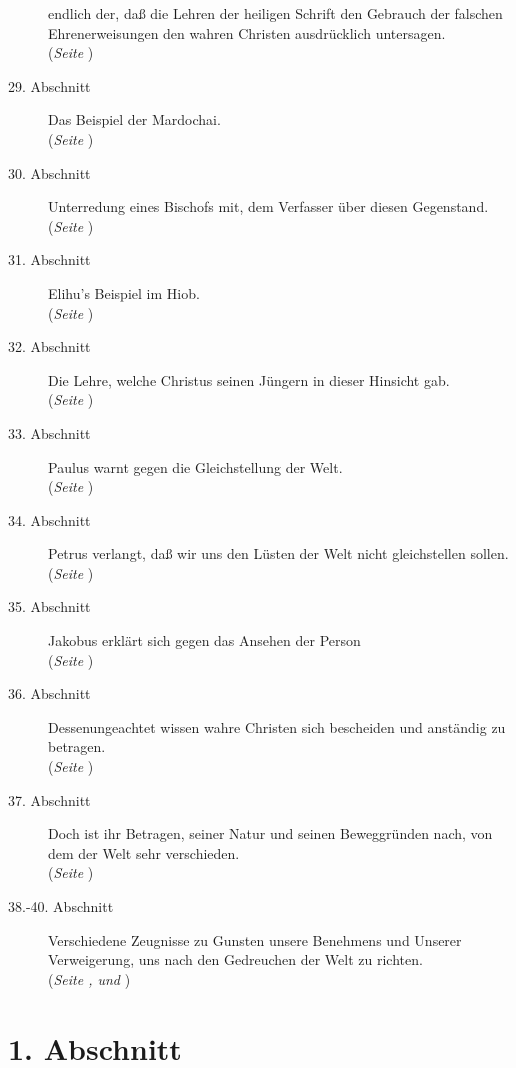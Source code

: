 \begin{description}
endlich der,
daß die Lehren der heiligen Schrift den Gebrauch der falschen Ehrenerweisungen
den wahren Christen ausdrücklich untersagen.
\\ (\textit{Seite \pageref{kap9_ab28}})
\item[29. Abschnitt] Das Beispiel der Mardochai.
\\ (\textit{Seite \pageref{kap9_ab29}})
\item[30. Abschnitt] Unterredung eines Bischofs mit, dem Verfasser über diesen
Gegenstand.
\\ (\textit{Seite \pageref{kap9_ab30}})
\item[31. Abschnitt] Elihu's Beispiel im Hiob.
\\ (\textit{Seite \pageref{kap9_ab31}})
\item[32. Abschnitt] Die Lehre, welche Christus seinen Jüngern in dieser
Hinsicht gab.
\\ (\textit{Seite \pageref{kap9_ab32}})
\item[33. Abschnitt] Paulus warnt gegen die Gleichstellung der Welt.
\\ (\textit{Seite \pageref{kap9_ab33}})
\item[34. Abschnitt] Petrus verlangt, daß wir uns den Lüsten der Welt nicht
gleichstellen sollen.
\\ (\textit{Seite \pageref{kap9_ab34}})
\item[35. Abschnitt] Jakobus erklärt sich gegen das Ansehen der Person
\\ (\textit{Seite \pageref{kap9_ab35}})
\item[36. Abschnitt] Dessenungeachtet wissen wahre Christen sich bescheiden und
anständig zu betragen.
\\ (\textit{Seite \pageref{kap9_ab36}})
\item[37. Abschnitt] Doch ist ihr Betragen, seiner Natur und seinen Beweggründen
nach, von dem der Welt sehr verschieden.
\\ (\textit{Seite \pageref{kap9_ab37}})
\item[38.-40. Abschnitt] Verschiedene Zeugnisse zu Gunsten unsere Benehmens und
Unserer Verweigerung, uns nach den Gedreuchen der Welt zu richten.
\\ (\textit{Seite \pageref{kap9_ab38}, \pageref{kap9_ab39} und \pageref{kap9_ab40}})

\end{description}
\normalsize

\section{1. Abschnitt} \label{kap9_ab1}


